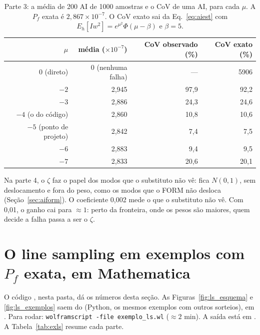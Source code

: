 \documentclass[11pt,a4paper]{article}
\begin{document}
\begin{table}[H]\centering\small
\caption{Parte 3: a média de 200 AI de 1000 amostras e o CoV de uma AI, para cada $\mu$. A $P_f$ exata é
$2{,}867\times10^{-7}$. O CoV exato sai da Eq.~\eqref{eq:aiest} com $E_h[I w^2] = e^{\mu^2}\Phi(\mu - \beta)$ e
$\beta = 5$.}\label{tab:mu}
\begin{tabular}{rrrr}
\toprule
$\mu$ & média ($\times10^{-7}$) & CoV observado (\%) & CoV exato (\%) \\
\midrule
0 (direto) & 0 (nenhuma falha) & --- & 5906 \\
$-2$ & 2,945 & 97,9 & 92,2 \\
$-3$ & 2,886 & 24,3 & 24,6 \\
$-4$ (o do código) & 2,860 & 10,8 & 10,6 \\
$-5$ (ponto de projeto) & 2,842 & 7,4 & 7,5 \\
$-6$ & 2,883 & 9,4 & 9,5 \\
$-7$ & 2,833 & 20,6 & 20,1 \\
\bottomrule
\end{tabular}
\end{table}
Na parte 4, o $\zeta$ faz o papel dos modos que o substituto não vê: fica $N(0, 1)$, sem deslocamento e fora do peso, como
os modos que o FORM não desloca (Seção~\ref{sec:aiform}). O coeficiente 0,002 mede o que o substituto não vê. Com 0,01, o
ganho cai para $\approx 1$: perto da fronteira, onde os pesos são maiores, quem decide a falha passa a ser o $\zeta$.



\section{O line sampling em exemplos com $P_f$ exata, em Mathematica}\label{ap:ls}
O código , nesta pasta, dá os números desta seção. As Figuras~\ref{fig:ls_esquema} e
\ref{fig:ls_exemplos} saem do  (Python, os mesmos exemplos com outros sorteios), em . Para rodar: \texttt{wolframscript -file exemplo\_ls.wl} ($\approx 2$ min). A saída está em
. A Tabela~\ref{tab:exls} resume cada parte.
\end{document}
